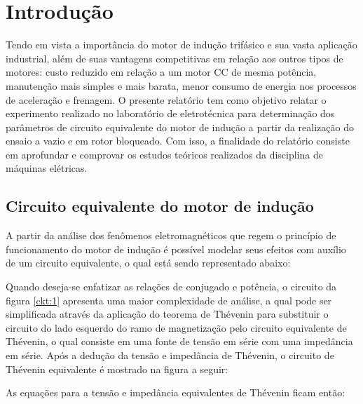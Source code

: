 \newcommand{\PR}[1]{\ensuremath{\left[#1\right]}}
\newcommand{\PC}[1]{\ensuremath{\left(#1\right)}}
\newcommand{\chav}[1]{\ensuremath{\left\{#1\right\}}}
\pagebreak
\tableofcontents
\pagebreak
\section{Introdução}

\par Tendo em vista a importância do motor de indução trifásico e sua vasta aplicação industrial, além de suas vantagens competitivas em relação aos outros tipos de motores: custo reduzido em relação a um motor CC de mesma potência, manutenção mais simples e mais barata, menor consumo de energia nos processos de aceleração e frenagem. O presente relatório tem como objetivo relatar o experimento realizado no laboratório de eletrotécnica para determinação dos parâmetros de circuito equivalente do motor de indução a partir da realização do ensaio a vazio e em rotor bloqueado. Com isso, a finalidade do relatório consiste em aprofundar e comprovar os estudos teóricos realizados da disciplina de máquinas elétricas.


\subsection{Circuito equivalente do motor de indução}

\par A partir da análise dos fenômenos eletromagnéticos que regem o princípio de funcionamento do motor de indução é possível modelar seus efeitos com auxílio de um circuito equivalente, o qual está sendo representado abaixo:




\par Quando deseja-se enfatizar as relações de conjugado e potência, o circuito da figura \ref{ckt:1} apresenta uma maior complexidade de análise, a qual pode ser simplificada através da aplicação do teorema de Thévenin para substituir o circuito do lado esquerdo do ramo de magnetização pelo circuito equivalente de Thévenin, o qual consiste em uma fonte de tensão em série com uma impedância em série. Após a dedução da tensão e impedância de Thévenin, o circuito de Thévenin equivalente é mostrado na figura a seguir:



\par As equações para a tensão e impedância equivalentes de Thévenin ficam então:

